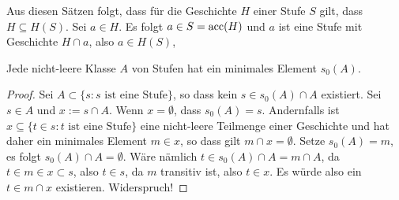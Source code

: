 Aus diesen Sätzen folgt, dass für die Geschichte $H$ einer Stufe $S$ gilt, dass $H \subseteq H(S)$. Sei $a\in H$. Es folgt $a\in S=\operatorname{acc}(H)$ und $a$ ist eine Stufe mit Geschichte $H\cap a$, also $a\in H(S)$,

\begin{satz}
	Jede nicht-leere Klasse $A$ von Stufen hat ein minimales Element $s_0(A)$.
\end{satz}
\begin{proof}
	Sei $A\subset\{s : s \text{ ist eine Stufe}\}$, so dass kein $s\in s_0(A)\cap A$ existiert. Sei $s\in A$ und $x:=s\cap A$. Wenn $x=\emptyset$, dass $s_0(A)=s$. 
	Andernfalls ist $x\subseteq\{t \in s : t \text{ ist eine Stufe}\}$ eine nicht-leere Teilmenge einer Geschichte und hat daher ein minimales Element $m\in x$, so dass gilt $m\cap x = \emptyset$. 
	Setze $s_0(A)=m$, es folgt $s_0(A)\cap A=\emptyset$. Wäre nämlich $t \in s_0(A)\cap A=m\cap A$, da $t\in m \in x \subset s$, also $t \in s$, da $m$ transitiv ist, also $t\in x$. Es würde also ein $t\in m\cap x$ existieren. Widerspruch!
\end{proof}

